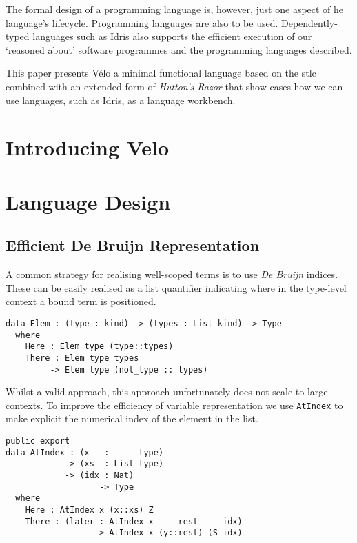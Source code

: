 \documentclass[%
draft,
a4paper,
UKenglish,
cleveref,
autoref,
thm-restate,
pdfa
]{oasics-v2021}
\newcommand{\Velo}{V{\'e}lo\xspace}
\begin{document}
The formal design of a programming language is, however, just one aspect of he language's lifecycle.
Programming languages are also to be used.
Dependently-typed languages such as Idris also supports the efficient execution of our `reasoned about' software programmes and the programming languages described.

This paper presents \Velo{} a minimal functional language based on the \ac{stlc} combined with an extended form of \emph{Hutton's Razor} that show cases how we can use languages, such as Idris, as a language workbench.

\section{Introducing Velo}
\label{sec:velo}



\section{Language Design}
\label{sec:design}

\subsection{Efficient De Bruijn Representation}
\label{sec:design:deBruijn}


A common strategy for realising well-scoped terms is to use \emph{De Bruijn} indices.
These can be easily realised as a list quantifier indicating where in the type-level context a bound term is positioned.

\begin{verbatim}
data Elem : (type : kind) -> (types : List kind) -> Type
  where
    Here : Elem type (type::types)
    There : Elem type types
         -> Elem type (not_type :: types)
\end{verbatim}

\noindent
Whilst a valid approach, this approach unfortunately does not scale to large contexts.
To improve the efficiency of variable representation we use \texttt{AtIndex} to make explicit the numerical index of the element in the list.

\begin{verbatim}
public export
data AtIndex : (x   :      type)
            -> (xs  : List type)
            -> (idx : Nat)
                   -> Type
  where
    Here : AtIndex x (x::xs) Z
    There : (later : AtIndex x     rest     idx)
                  -> AtIndex x (y::rest) (S idx)
\end{verbatim}
\end{document}
